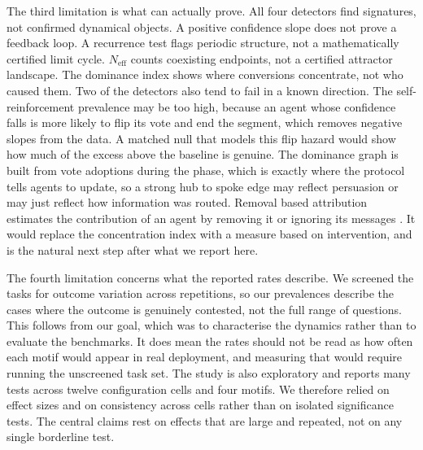 The third limitation is what \suitename{} can actually prove. All four detectors
find signatures, not confirmed dynamical objects. A positive confidence slope
does not prove a feedback loop. A recurrence test flags periodic structure, not a
mathematically certified limit cycle. $N_{\mathrm{eff}}$ counts coexisting
endpoints, not a certified attractor landscape. The dominance index shows where
conversions concentrate, not who caused them. Two of the detectors also tend to
fail in a known direction. The self-reinforcement prevalence may be too high,
because an agent whose confidence falls is more likely to flip its vote and end
the segment, which removes negative slopes from the data. A matched null that
models this flip hazard would show how much of the excess above the baseline is
genuine. The dominance graph is built from vote adoptions during the
\updatephase{} phase, which is exactly where the protocol tells agents to update,
so a strong hub to spoke edge may reflect persuasion or may just reflect how
information was routed. Removal based attribution estimates the
contribution of an agent by removing it or ignoring its messages
\citep{agentsthatmatter2026, cui2025introspecloo}. It would replace the
concentration index with a measure based on intervention, and is the natural next
step after what we report here.

The fourth limitation concerns what the reported rates describe. We screened the
tasks for outcome variation across repetitions, so our prevalences describe the
cases where the outcome is genuinely contested, not the full range of questions.
This follows from our goal, which was to characterise the dynamics rather than to
evaluate the benchmarks. It does mean the rates should not be read as how often
each motif would appear in real deployment, and measuring that would require
running the unscreened task set. The study is also exploratory and reports many
tests across twelve configuration cells and four motifs. We therefore relied on
effect sizes and on consistency across cells rather than on isolated significance
tests. The central claims rest on effects that are large and repeated, not on any
single borderline test.